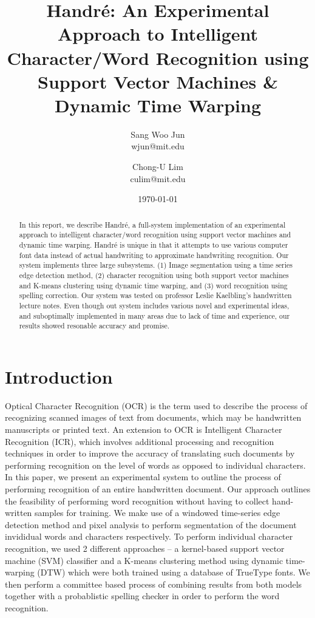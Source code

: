 \documentclass[12pt]{article}
\title{Handr\'{e}: An Experimental Approach to Intelligent Character/Word Recognition using Support Vector Machines \& Dynamic Time Warping}
\date{\today}
\author{
	Sang Woo Jun \\ 
	wjun@mit.edu \\ 
  \and
  Chong-U Lim\\
  culim@mit.edu
}
\begin{document}
\maketitle

\begin{abstract}

	In this report, we describe Handr\'{e}, a full-system implementation of an experimental approach to intelligent character/word recognition using support vector machines and dynamic time warping. Handr\'{e} is unique in that it attempts to use various computer font data instead of actual handwriting to approximate handwriting recognition. Our system implements three large subsystems. (1) Image segmentation using a time series edge detection method, (2) character recognition using both support vector machines and K-means clustering using dynamic time warping, and (3) word recognition using spelling correction. Our system was tested on professor Leslie Kaelbling's handwritten lecture notes. Even though out system includes various novel and experimental ideas, and suboptimally implemented in many areas due to lack of time and experience, our results showed resonable accuracy and promise.
	
\end{abstract}

\newpage
\tableofcontents
\newpage
\section{Introduction}

	Optical Character Recognition (OCR) is the term used to describe the process of recognizing scanned images of text from documents, which may be handwritten manuscripts or printed text. An extension to OCR is Intelligent Character Recognition (ICR), which involves additional processing and recognition techniques in order to improve the accuracy of translating such documents by performing recognition on the level of words as opposed to individual characters. In this paper, we present an experimental system to outline the process of performing recognition of an entire handwritten document. Our approach outlines the feasibility of performing word recognition without having to collect hand-written samples for training. We make use of a windowed time-series edge detection method and pixel analysis to perform segmentation of the document invididual words and characters respectively. To perform individual character recognition, we used 2 different approaches -- a kernel-based support vector machine (SVM) classifier and a K-means clustering method using dynamic time-warping (DTW) which were both trained using a database of TrueType fonts. We then perform a committee based process of combining results from both models together with a probablistic spelling checker in order to perform the word recognition. 
\end{document}
